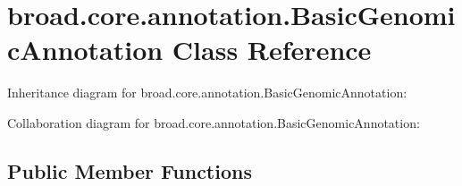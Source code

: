 \hypertarget{classbroad_1_1core_1_1annotation_1_1_basic_genomic_annotation}{\section{broad.\+core.\+annotation.\+Basic\+Genomic\+Annotation Class Reference}
\label{classbroad_1_1core_1_1annotation_1_1_basic_genomic_annotation}
}


Inheritance diagram for broad.\+core.\+annotation.\+Basic\+Genomic\+Annotation\+:


Collaboration diagram for broad.\+core.\+annotation.\+Basic\+Genomic\+Annotation\+:
\subsection*{Public Member Functions}
